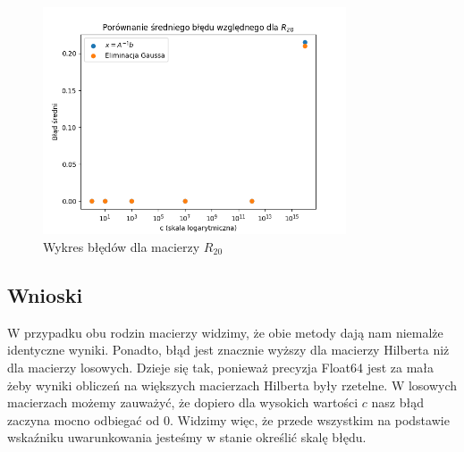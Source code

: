 \documentclass{article}
\begin{document}
\begin{figure}[H]
  \centering
  \includegraphics[width=0.8\textwidth]{../images/random_n_20.png}
  \caption{Wykres błędów dla macierzy $R_{20}$}
\end{figure}

\subsection*{Wnioski}
W przypadku obu rodzin macierzy widzimy, że obie metody
dają nam niemalże identyczne wyniki. Ponadto, błąd jest
znacznie wyższy dla macierzy Hilberta niż dla macierzy losowych.
Dzieje się tak, ponieważ precyzja Float64 jest za mała żeby
wyniki obliczeń na większych macierzach Hilberta były rzetelne.
W losowych macierzach możemy zauważyć, że dopiero dla wysokich
wartości $c$ nasz błąd zaczyna mocno odbiegać od $0$. Widzimy więc,
że przede wszystkim na podstawie wskaźniku uwarunkowania jesteśmy
w stanie określić skalę błędu.
\end{document}
